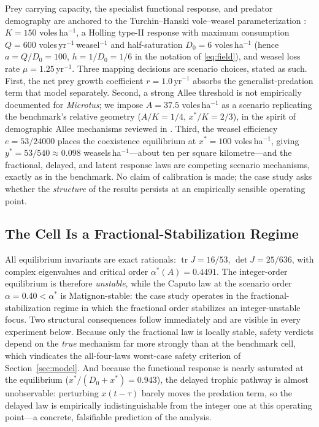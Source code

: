 \documentclass[mathematics,article,accept,pdftex,moreauthors]{Definitions/mdpi}
\begin{document}
Prey carrying capacity, the specialist functional response, and predator demography are anchored to the Turchin--Hanski vole--weasel parameterization \cite{TurchinHanski1997}: $K=150$ voles\,ha$^{-1}$, a Holling type-II response with maximum consumption $Q=600$ voles\,yr$^{-1}$\,weasel$^{-1}$ and half-saturation $D_{0}=6$ voles\,ha$^{-1}$ (hence $a=Q/D_{0}=100$, $h=1/D_{0}=1/6$ in the notation of \eqref{eq:field}), and weasel loss rate $\mu=1.25$\,yr$^{-1}$. Three mapping decisions are scenario choices, stated as such. First, the net prey growth coefficient $r=1.0$\,yr$^{-1}$ absorbs the generalist-predation term that \cite{TurchinHanski1997} model separately. Second, a strong Allee threshold is not empirically documented for \emph{Microtus}; we impose $A=37.5$ voles\,ha$^{-1}$ as a scenario replicating the benchmark's relative geometry ($A/K=1/4$, $x^{*}/K=2/3$), in the spirit of demographic Allee mechanisms reviewed in \cite{Courchamp2008}. Third, the weasel efficiency $e=53/24000$ places the coexistence equilibrium at $x^{*}=100$ voles\,ha$^{-1}$, giving $y^{*}=53/540\approx0.098$ weasels\,ha$^{-1}$---about ten per square kilometre---and the fractional, delayed, and latent response laws are competing scenario mechanisms, exactly as in the benchmark. No claim of calibration is made; the case study asks whether the \emph{structure} of the results persists at an empirically sensible operating point.

\subsection{The Cell Is a Fractional-Stabilization Regime}

All equilibrium invariants are exact rationals: $\operatorname{tr}J=16/53$, $\det J=25/636$, with complex eigenvalues and critical order $\alpha^{*}(A)=0.4491$. The integer-order equilibrium is therefore \emph{unstable}, while the Caputo law at the scenario order $\alpha=0.40<\alpha^{*}$ is Matignon-stable: the case study operates in the fractional-stabilization regime in which the fractional order stabilizes an integer-unstable focus. Two structural consequences follow immediately and are visible in every experiment below. Because only the fractional law is locally stable, safety verdicts depend on the \emph{true} mechanism far more strongly than at the benchmark cell, which vindicates the all-four-laws worst-case safety criterion of Section~\ref{sec:model}. And because the functional response is nearly saturated at the equilibrium ($x^{*}/(D_{0}+x^{*})=0.943$), the delayed trophic pathway is almost unobservable: perturbing $x(t-\tau)$ barely moves the predation term, so the delayed law is empirically indistinguishable from the integer one at this operating point---a concrete, falsifiable prediction of the analysis.
\end{document}
